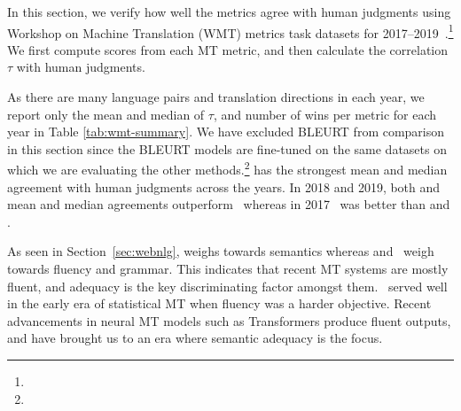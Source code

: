 In this section, we verify how well the metrics agree with human judgments using Workshop on Machine Translation (WMT) metrics task datasets for 2017--2019~\cite{WMT17-metrics,WMT18-metrics,WMT19-metrics-proceedings}.\footnote{}
We first compute scores from each MT metric, and then calculate the correlation $\tau$ with human judgments.

As there are many language pairs and translation directions in each year, we report only the mean and median of $\tau$, and number of wins per metric for each year in Table \ref{tab:wmt-summary}. %
We have excluded BLEURT from comparison in this section since the BLEURT models are fine-tuned on the same datasets on which we are evaluating the other methods.\footnote{}
 has the strongest mean and median agreement with human judgments across the years.
In 2018 and 2019, both  and  mean and median agreements outperform \bleu\, whereas in 2017 \bleu\ was better than  and .%

As seen in Section~\ref{sec:webnlg},  weighs towards semantics whereas  and \bleu\ weigh towards fluency and grammar.
This indicates that recent MT systems are mostly fluent, and adequacy is the key discriminating factor amongst them.
\bleu\ served well in the early era of statistical MT when fluency was a harder objective. 
Recent advancements in neural MT models such as Transformers \cite{vaswani2017attention} produce fluent outputs, and have brought us to an era where semantic adequacy is the focus.




